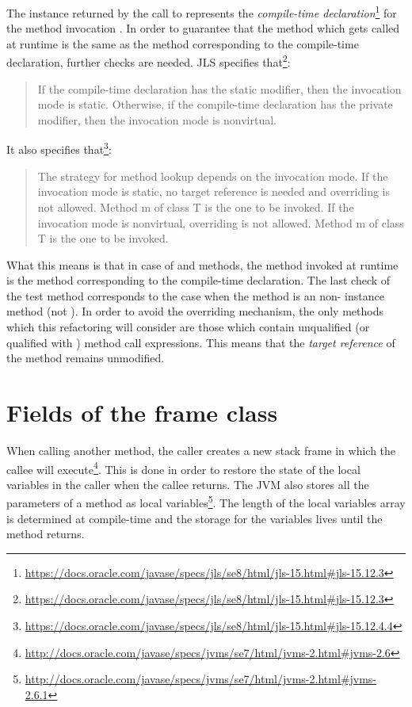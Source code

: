 The  instance returned by the call to  represents the
\textit{compile-time declaration}\footnote{\url{https://docs.oracle.com/javase/specs/jls/se8/html/jls-15.html#jls-15.12.3}}
for the method invocation . In order to guarantee that the method which gets called at runtime is the
same as the method corresponding to the compile-time declaration, further checks are needed.
JLS specifies that\footnote{\url{https://docs.oracle.com/javase/specs/jls/se8/html/jls-15.html#jls-15.12.3}}:
\begin{quote}
    If the compile-time declaration has the static modifier, then the invocation mode is static.
    Otherwise, if the compile-time declaration has the private modifier, then the invocation mode is nonvirtual.
\end{quote}
It also specifies that\footnote{\url{https://docs.oracle.com/javase/specs/jls/se8/html/jls-15.html#jls-15.12.4.4}}:
\begin{quote}
    The strategy for method lookup depends on the invocation mode.
    If the invocation mode is static, no target reference is needed and overriding is not allowed. Method m of class T is the one to be invoked.
    If the invocation mode is nonvirtual, overriding is not allowed. Method m of class T is the one to be invoked.
\end{quote}

What this means is that in case of  and  methods, the method invoked at runtime is the method
corresponding to the compile-time declaration. The last check of the test method corresponds to the case when the method
is an non- instance method (not ). In order to avoid the overriding mechanism, the only
methods which this refactoring will consider are those which contain unqualified (or qualified with ) method
call expressions. This means that the \textit{target reference} of the method remains unmodified.

\section{Fields of the frame class}

When calling another method, the caller creates a new stack frame in which the callee will
execute\footnote{\url{http://docs.oracle.com/javase/specs/jvms/se7/html/jvms-2.html#jvms-2.6}}. This is done
in order to restore the state of the local variables in the caller when the callee returns. The JVM also stores all
the parameters of a method as local
variables\footnote{\url{http://docs.oracle.com/javase/specs/jvms/se7/html/jvms-2.html#jvms-2.6.1}}. The length of the
local variables array is determined at compile-time and the storage for the variables lives until the method returns.

